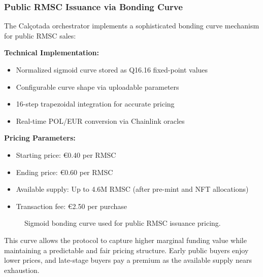 \documentclass[conference]{IEEEtran}
\begin{document}
\subsubsection{Public RMSC Issuance via Bonding Curve}

The Calçotada orchestrator implements a sophisticated bonding curve mechanism for public RMSC sales:

\textbf{Technical Implementation:}
\begin{itemize}
    \item Normalized sigmoid curve stored as Q16.16 fixed-point values
    \item Configurable curve shape via uploadable parameters
    \item 16-step trapezoidal integration for accurate pricing
    \item Real-time POL/EUR conversion via Chainlink oracles
\end{itemize}

\textbf{Pricing Parameters:}
\begin{itemize}
    \item Starting price: €0.40 per RMSC
    \item Ending price: €0.60 per RMSC  
    \item Available supply: Up to 4.6M RMSC (after pre-mint and NFT allocations)
    \item Transaction fee: €2.50 per purchase
\end{itemize}
\begin{figure}[ht]
\centering
{}
\caption{Sigmoid bonding curve used for public RMSC issuance pricing.}
\label{fig:sigmoidcurve}
\end{figure}



This curve allows the protocol to capture higher marginal funding value while maintaining a predictable and fair pricing structure. Early public buyers enjoy lower prices, and late-stage buyers pay a premium as the available supply nears exhaustion.
\end{document}
